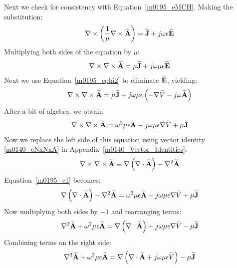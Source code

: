 Next we check for consistency with Equation~\ref{m0195_eMCH}.  Making the substitution:
%
\begin{equation}
\nabla \times \left(\frac{1}{\mu}\nabla \times \widetilde{\bf A}\right) = \widetilde{\bf J} +j\omega\epsilon\widetilde{\bf E}
\end{equation}
%
Multiplying both sides of the equation by $\mu$:
%
\begin{equation}
\nabla \times \nabla \times \widetilde{\bf A} = \mu\widetilde{\bf J} +j\omega\mu\epsilon\widetilde{\bf E}
\end{equation}
%
Next we use Equation~\ref{m0195_ephi2} to eliminate $\widetilde{\bf E}$, yielding:
%
\begin{equation}
\nabla \times \nabla \times \widetilde{\bf A} = \mu\widetilde{\bf J} +j\omega\mu\epsilon\left(-\nabla\widetilde V -j\omega \widetilde{\bf A}\right)
\end{equation}
%
After a bit of algebra, we obtain
%
\begin{equation}
\nabla \times \nabla \times \widetilde{\bf A}
= \omega^2\mu\epsilon\widetilde{\bf A} - j\omega\mu\epsilon\nabla\widetilde V + \mu\widetilde{\bf J} 
\label{m0195_e1}
\end{equation}
%
Now we replace the left side of this equation using vector identity \ref{m0140_eNxNxA} in Appendix~\ref{m0140_Vector_Identities}:
%
\begin{equation}
\nabla \times \nabla \times \widetilde{\bf A} \equiv \nabla\left(\nabla \cdot \widetilde{\bf A}\right) - \nabla^2 \widetilde{\bf A}
\end{equation}
%
Equation~\ref{m0195_e1} becomes:
%
\begin{equation}
\nabla\left(\nabla \cdot \widetilde{\bf A}\right) - \nabla^2 \widetilde{\bf A}
= \omega^2\mu\epsilon\widetilde{\bf A} - j\omega\mu\epsilon\nabla\widetilde V + \mu\widetilde{\bf J} 
\end{equation}
%
Now multiplying both sides by $-1$ and rearranging terms:
%
\begin{equation}
\nabla^2 \widetilde{\bf A}
+\omega^2\mu\epsilon\widetilde{\bf A} 
= 
\nabla\left(\nabla \cdot \widetilde{\bf A}\right)
+j\omega\mu\epsilon\nabla\widetilde V 
-\mu\widetilde{\bf J} 
\end{equation}
%
Combining terms on the right side:
%
\begin{equation}
\nabla^2 \widetilde{\bf A}
+\omega^2\mu\epsilon\widetilde{\bf A} 
= 
\nabla\left( \nabla \cdot \widetilde{\bf A} +j\omega\mu\epsilon\widetilde V\right) 
-\mu\widetilde{\bf J} 
\label{m0195_eWEA1}
\end{equation}
